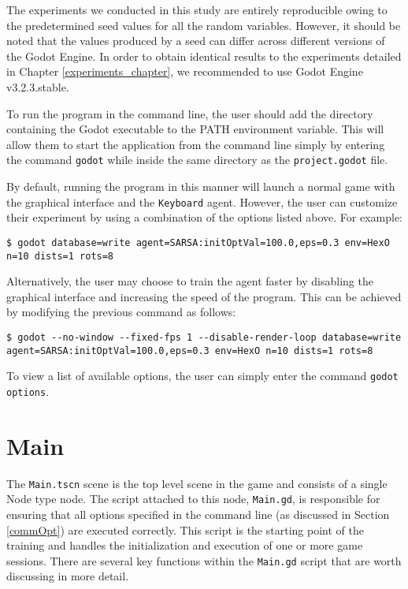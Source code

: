 The experiments we conducted in this study are entirely reproducible owing to the predetermined seed values for all the random variables. However, it should be noted that the values produced by a seed can differ across different versions of the Godot Engine. In order to obtain identical results to the experiments detailed in Chapter \ref{experiments_chapter}, we recommended to use Godot Engine v3.2.3.stable.

To run the program in the command line, the user should add the directory containing the Godot executable to the PATH environment variable. This will allow them to start the application from the command line simply by entering the command \texttt{godot} while inside the same directory as the \texttt{project.godot} file.

By default, running the program in this manner will launch a normal game with the graphical interface and the \texttt{Keyboard} agent. However, the user can customize their experiment by using a combination of the options listed above. For example:

\begin{center}
\hrulefill
\begin{lstlisting}
$ godot database=write agent=SARSA:initOptVal=100.0,eps=0.3 env=HexO n=10 dists=1 rots=8
\end{lstlisting}
\hrulefill
\end{center}

Alternatively, the user may choose to train the agent faster by disabling the graphical interface and increasing the speed of the program. This can be achieved by modifying the previous command as follows:

\begin{center}
\hrulefill
\begin{lstlisting}
$ godot --no-window --fixed-fps 1 --disable-render-loop database=write agent=SARSA:initOptVal=100.0,eps=0.3 env=HexO n=10 dists=1 rots=8
\end{lstlisting}
\hrulefill
\end{center}

To view a list of available options, the user can simply enter the command \texttt{godot options}.

\section{Main}
The \texttt{Main.tscn} scene is the top level scene in the game and consists of a single Node type node. The script attached to this node, \texttt{Main.gd}, is responsible for ensuring that all options specified in the command line (as discussed in Section \ref{commOpt}) are executed correctly. This script is the starting point of the training and handles the initialization and execution of one or more game sessions.
There are several key functions within the \texttt{Main.gd} script that are worth discussing in more detail.

